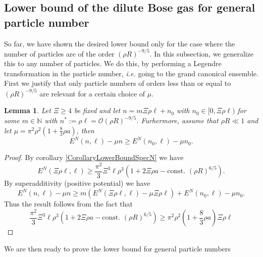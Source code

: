 \documentclass[a4paper,11pt]{article}
\newcommand{\ie}{\emph{i.e.} }
\newtheorem{lemma}{Lemma}
\numberwithin{equation}{section}
\begin{document}
	\subsection{Lower bound of the dilute Bose gas for general particle number}
	So far, we have shown the desired lower bound only for the case where the number of particles are of the order $ (\rho R)^{-9/5} $. In this subsection, we generalize this to any number of particles. We do this, by performing a Legendre transformation in the particle number, \ie going to the grand canonical ensemble. First we justify that only particle numbers of orders less than or equal to $ (\rho R)^{-9/5} $ are relevant for a certain choice of $ \mu $.
		\begin{lemma}\label{LemmaLocalizationFbound}
			Let $ \Xi\geq 4 $ be fixed and let $ n=m\Xi \rho \ell+n_0 $ with $ n_0\in[0,\Xi\rho \ell) $ for some $ m\in\mathbb{N} $ with $ n^{\ast}:=\rho\ell=\mathcal{O}(\rho R)^{-9/5} $. Furhermore, assume that $ \rho R\ll 1 $ and let $ \mu=\pi^2\rho^2\left(1+\frac{8}{3}\rho a\right) $, then \begin{equation}
			E^{N}(n,\ell)-\mu n \geq E^{N}(n_0,\ell)-\mu n_0.
			\end{equation}
		\end{lemma}
		\begin{proof}
			By corollary \ref{CorollaryLowerBoundSpecN} we have \begin{equation}
			E^{N}(\Xi\rho\ell,\ell)\geq\frac{\pi^2}{3}\Xi^3\ell\rho^3\left(1+2\Xi\rho a-\text{const. }(\rho R)^{6/5}\right).
			\end{equation}
			By superadditivity (positive potential) we have \begin{equation}
			E^N(n,\ell)-\mu n\geq m\left(E^N(\Xi\rho\ell,\ell)-\mu\Xi\rho\ell \right)+E^N(n_0,\ell)-\mu n_0.
			\end{equation}
			Thus the result follows from the fact that \begin{equation}
			\frac{\pi^2}{3}\Xi^3\ell\rho^3\left(1+2\Xi\rho a-\text{const. }(\rho R)^{6/5}\right)\geq \pi^2\rho^2\left(1+\frac{8}{3}\rho a\right) \Xi\rho\ell
			\end{equation}
		\end{proof}
	We are then ready to prove the lower bound for general particle numbers
	
\end{document}
